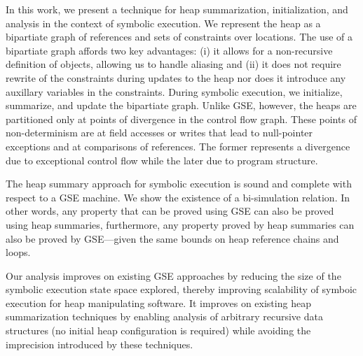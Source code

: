 In this work, we present a technique for heap summarization,
initialization, and analysis in the context of symbolic execution. We
represent the heap as a bipartiate graph of references and sets of
constraints over locations. The use of a bipartiate graph affords two
key advantages: (i) it allows for a non-recursive definition of
objects, allowing us to handle aliasing and (ii) it does not require
rewrite of the constraints during updates to the heap nor does it
introduce any auxillary variables in the constraints. During symbolic
execution, we initialize, summarize, and update the bipartiate
graph. Unlike GSE, however, the heaps are partitioned only at points
of divergence in the control flow graph. These points of
non-determinism are at field accesses or writes that lead to
null-pointer exceptions and at comparisons of references. The former
represents a divergence due to exceptional control flow while the
later due to program structure.


The heap summary approach for symbolic execution is sound and complete
with respect to a GSE machine. We show the existence of a
bi-simulation relation. In other words, any property that can be
proved using GSE can also be proved using heap summaries, furthermore,
any property proved by heap summaries can also be proved by
GSE---given the same bounds on heap reference chains and loops.



 Our analysis improves on existing GSE approaches by reducing
the size of the symbolic execution state space explored, thereby
improving scalability of symboic execution for heap manipulating
software. It improves on existing heap summarization techniques by
enabling analysis of arbitrary recursive data structures (no initial
heap configuration is required) while avoiding the imprecision
introduced by these techniques.


